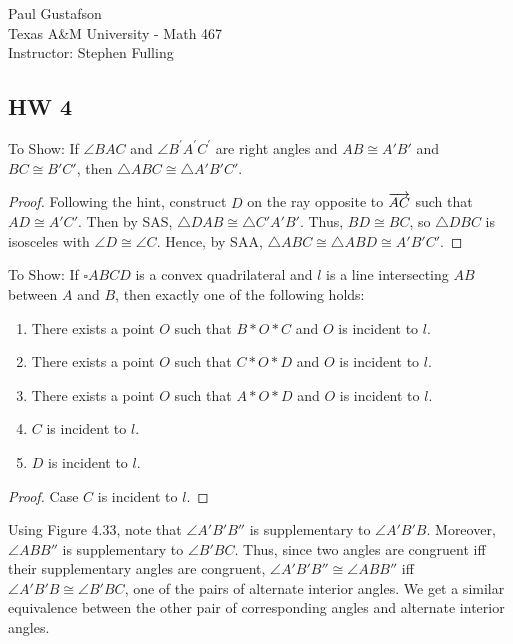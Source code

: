 \documentclass{article}
\begin{document}
\noindent Paul Gustafson\\
\noindent Texas A\&M University - Math 467\\ 
\noindent Instructor: Stephen Fulling

\subsection*{HW 4}
 To Show: If $\angle BAC$ and $\angle B^\prime A^\prime C^\prime$ are right angles and $AB \cong A'B'$ and $BC \cong B'C'$, then $\triangle ABC \cong \triangle A'B'C'$.
\begin{proof}
Following the hint, construct $D$ on the ray opposite to $\overrightarrow{AC}$ such that $AD \cong A'C'$.  Then by SAS, $\triangle DAB \cong \triangle C'A'B'$. Thus, $BD \cong BC$, so $\triangle DBC$ is isosceles with $\angle D \cong \angle C$.  Hence, by SAA, $\triangle ABC \cong \triangle ABD \cong A'B'C'$.
\end{proof}

 To Show: If $\square ABCD$ is a convex quadrilateral and $l$ is a line intersecting $AB$ between $A$ and $B$, then exactly one of the following holds:
\begin{enumerate}
\item There exists a point $O$ such that $B*O*C$ and $O$ is incident to $l$.
\item There exists a point $O$ such that $C*O*D$ and $O$ is incident to $l$.
\item There exists a point $O$ such that $A*O*D$ and $O$ is incident to $l$.
\item $C$ is incident to $l$.
\item $D$ is incident to $l$.
\end{enumerate}
\begin{proof}
Case $C$ is incident to $l$.  
\end{proof}

 Using Figure 4.33, note that $\angle A'B'B''$ is supplementary to $\angle A'B'B$. Moreover, $\angle ABB''$ is supplementary to $\angle B'BC$.  Thus, since two angles are congruent iff their supplementary angles are congruent, $\angle A'B'B'' \cong \angle ABB''$ iff $\angle A'B'B \cong \angle B'BC$, one of the pairs of alternate interior angles.  We get a similar equivalence between the other pair of corresponding angles and alternate interior angles.
\end{document}

